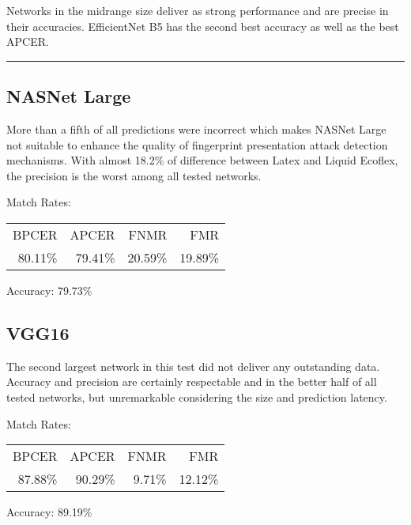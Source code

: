 Networks in the midrange size deliver as strong performance and are precise in their accuracies.
EﬀicientNet B5 has the second best accuracy as well as the best APCER.

\bigskip\hrule


\subsection{NASNet Large}
\begin{minipage}[c]{0.7\textwidth}
    More than a fifth of all predictions were incorrect which makes NASNet Large not suitable to enhance the quality of fingerprint presentation attack detection mechanisms.
    With almost 18.2\% of difference between Latex and Liquid Ecoflex, the precision is the worst among all tested networks.

    \medskip\centering Match Rates: 
    \begin{tabular}{ r  r  r  r |}
        BPCER       & APCER      & FNMR     & FMR     \\
        80.11\%   & 79.41\%   & 20.59\%  & 19.89\%  \\
    \end{tabular} \hspace{2mm} Accuracy: 79.73\%
\end{minipage}
\hfill
\begin{minipage}[t]{0.3\textwidth}
    \centering
    
\end{minipage}



\subsection{VGG16}
\begin{minipage}[c]{0.7\textwidth}
    The second largest network in this test did not deliver any outstanding data.
    Accuracy and precision are certainly respectable and in the better half of all tested networks, but unremarkable considering the size and prediction latency.

    \medskip\centering Match Rates: 
    \begin{tabular}{ r  r  r  r |}
        BPCER       & APCER      & FNMR     & FMR     \\
        87.88\%   & 90.29\%   & 9.71\%   & 12.12\%  \\
    \end{tabular} \hspace{2mm} Accuracy: 89.19\%
\end{minipage}
\hfill
\begin{minipage}[c]{0.3\textwidth}
    \centering
    
\end{minipage}



